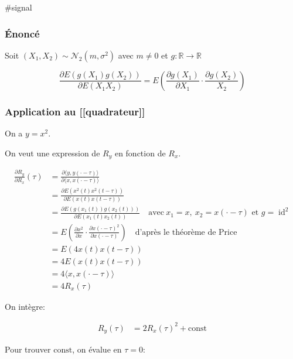 \documentclass[
]{article}
\begin{document}
\#signal

\hypertarget{uxe9noncuxe9}{%
\subsubsection{Énoncé}\label{uxe9noncuxe9}}

Soit \((X_1, X_2) \sim \mathcal{N}_2(m, \sigma^2)\) avec \(m \neq 0\) et
\(g: \mathbb{R} \to \mathbb{R}\)

\[
\frac{\partial E(g(X_1) g(X_2))}{\partial E(X_1 X_2)} = E\left( \frac{\partial g(X_1)}{\partial X_1} \cdot \frac{\partial g(X_2)}{X_2}  \right)
\]

\hypertarget{application-au-quadrateur}{%
\subsubsection{Application au
{[}{[}quadrateur{]}{]}}\label{application-au-quadrateur}}

On a \(y = x^2\).

On veut une expression de \(R_y\) en fonction de \(R_x\).

\begin{align*}
\frac{\partial R_y}{\partial R_x}(\tau)  &= \frac{\partial \langle y, y(\cdot -\tau) \rangle }{\partial \langle x, x(\cdot -\tau) \rangle} \\
&= \frac{\partial E(x^2(t) x^2(t-\tau))}{\partial E(x(t) x(t-\tau))} \\
&= \frac{\partial E(g(x_1(t)) g(x_2(t)) )}{\partial E(x_1(t) x_2(t))} \quad \text{avec}\ x_1 = x,\ x_2 = x(\cdot - \tau) \text{ et } g = \operatorname{id}^2 \\
&= E\left( \frac{\partial x^2}{\partial x} \cdot \frac{\partial x(\cdot - \tau)^2}{\partial x(\cdot - \tau)} \right) \quad \text{d'après le théorème de Price} \\
&= E(4x(t)x(t-\tau)) \\
&= 4 E(x(t) x(t-\tau)) \\
&= 4 \langle x, x(\cdot - \tau) \rangle \\
&= 4 R_x(\tau)
\end{align*}

On intègre:

\begin{align*}
R_y(\tau) &= 2R_x(\tau)^2 + \text{const}
\end{align*}

Pour trouver \(\text{const}\), on évalue en \(\tau = 0\):
\end{document}
